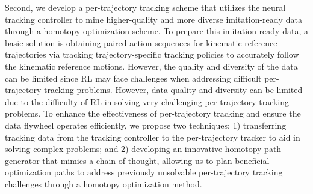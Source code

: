 Second, we develop a per-trajectory tracking scheme that utilizes the neural tracking controller to mine higher-quality and more diverse imitation-ready data through a homotopy optimization scheme. To prepare this imitation-ready data, a basic solution is obtaining paired action sequences for kinematic reference trajectories via tracking trajectory-specific tracking policies to accurately follow the kinematic reference motions. 
However, the quality and diversity of the data can be limited since RL may face challenges when addressing difficult per-trajectory tracking problems. 
However, data quality and diversity can be limited due to the difficulty of RL in solving very challenging per-trajectory tracking problems. To enhance the effectiveness of per-trajectory tracking and ensure the data flywheel operates efficiently, we propose two techniques: 1) transferring tracking data from the tracking controller to the per-trajectory tracker to aid in solving complex problems; and 2) developing an innovative homotopy path generator that mimics a chain of thought, allowing us to plan beneficial optimization paths to address previously unsolvable per-trajectory tracking challenges through a homotopy optimization method. 





